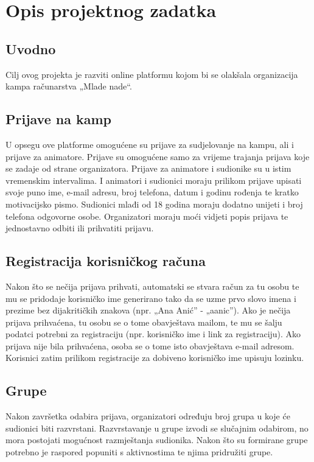 \chapter{Opis projektnog zadatka}

		\section{Uvodno}
		Cilj ovog projekta je razviti online platformu kojom bi se olakšala organizacija kampa računarstva „Mlade nade“.
		
		\section{Prijave na kamp}
		U opsegu ove platforme omogućene su prijave za sudjelovanje na kampu, ali i prijave za animatore. Prijave su omogućene samo za vrijeme trajanja prijava koje se zadaje od strane organizatora. Prijave za animatore i sudionike su u istim vremenskim intervalima. I animatori i sudionici moraju prilikom prijave upisati svoje puno ime, e-mail adresu, broj telefona, datum i godinu rođenja te kratko motivacijsko pismo. Sudionici mlađi od 18 godina moraju dodatno unijeti i broj telefona odgovorne osobe. Organizatori moraju moći vidjeti popis prijava te jednostavno odbiti ili prihvatiti prijavu.
		
		\section{Registracija korisničkog računa}
		Nakon što se nečija prijava prihvati, automatski se stvara račun za tu osobu te mu se pridodaje korisničko ime generirano tako da se uzme prvo slovo imena i prezime bez dijakritičkih znakova (npr. „Ana Anić” - „aanic”). Ako je nečija prijava prihvaćena, tu osobu se o tome obavještava mailom, te mu se šalju podatci potrebni za registraciju (npr. korisničko ime i link za registraciju). Ako prijava nije bila prihvaćena, osoba se o tome isto obavještava e-mail adresom. Korisnici zatim prilikom registracije za dobiveno korisničko ime upisuju lozinku.
		
		\section{Grupe}
		Nakon završetka odabira prijava, organizatori određuju broj grupa u koje će sudionici biti razvrstani. Razvrstavanje u grupe izvodi se slučajnim odabirom, no mora postojati mogućnost razmještanja sudionika. Nakon što su formirane grupe potrebno je raspored popuniti s aktivnostima te njima pridružiti grupe.
		
